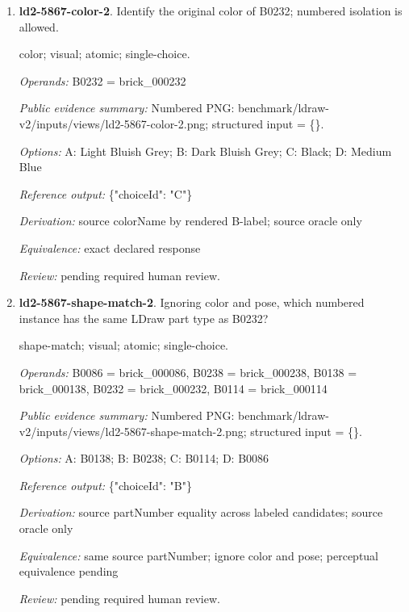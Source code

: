\begin{enumerate}
\par{\small distance; source-data; atomic; single-choice.\par\textit{Operands:} B0127 = brick\_000127, B0048 = brick\_000048, B0126 = brick\_000126, B0258 = brick\_000258\par\textit{Public evidence summary:} \{"coordinateFrame": "Viewer world, millimeters, Euclidean distance", "centers": \{"B0126": [82.4, 21.6, -28], "B0258": [-56, 30.4, 4], "B0127": [82.4, 21.6, 28], "B0048": [-80.8, 8.8, 20]\}\}\par\textit{Options:} A: B0048; B: B0127; C: B0258\par\textit{Reference output:} \{"choiceId": "B"\}\par\textit{Derivation:} Euclidean norm from public rounded centers\par\textit{Equivalence:} exact declared response\par\textit{Review:} machine checks passed; no human certification.}
\item \textbf{ld2-5867-color-2}. Identify the original color of B0232; numbered isolation is allowed.
\par{\small color; visual; atomic; single-choice.\par\textit{Operands:} B0232 = brick\_000232\par\textit{Public evidence summary:} Numbered PNG: benchmark/ldraw-v2/inputs/views/ld2-5867-color-2.png; structured input = \{\}.\par\textit{Options:} A: Light Bluish Grey; B: Dark Bluish Grey; C: Black; D: Medium Blue\par\textit{Reference output:} \{"choiceId": "C"\}\par\textit{Derivation:} source colorName by rendered B-label; source oracle only\par\textit{Equivalence:} exact declared response\par\textit{Review:} pending required human review.}
\item \textbf{ld2-5867-shape-match-2}. Ignoring color and pose, which numbered instance has the same LDraw part type as B0232?
\par{\small shape-match; visual; atomic; single-choice.\par\textit{Operands:} B0086 = brick\_000086, B0238 = brick\_000238, B0138 = brick\_000138, B0232 = brick\_000232, B0114 = brick\_000114\par\textit{Public evidence summary:} Numbered PNG: benchmark/ldraw-v2/inputs/views/ld2-5867-shape-match-2.png; structured input = \{\}.\par\textit{Options:} A: B0138; B: B0238; C: B0114; D: B0086\par\textit{Reference output:} \{"choiceId": "B"\}\par\textit{Derivation:} source partNumber equality across labeled candidates; source oracle only\par\textit{Equivalence:} same source partNumber; ignore color and pose; perceptual equivalence pending\par\textit{Review:} pending required human review.}

\end{enumerate}
